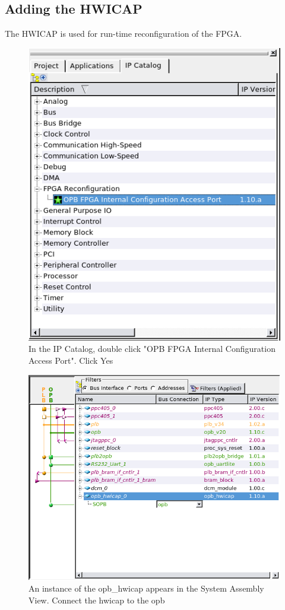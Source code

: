 \documentclass[a4paper,oneside]{memoir}
\begin{document}
\subsection{Adding the HWICAP}
The HWICAP is used for run-time reconfiguration of the FPGA.
\begin{figure}[H]
\centering
\includegraphics[scale=0.5]{HWICAP1}
\caption{In the IP Catalog, double click "OPB FPGA Internal Configuration Access Port". Click Yes\label{fig:HWICAP1}}
\end{figure}
\begin{figure}[H]
\centering
\includegraphics[scale=0.5]{HWICAP2}
\caption{An instance of the opb\_hwicap appears in the System Assembly View. Connect the hwicap to the opb\label{fig:HWICAP2}}
\end{figure}
\end{document}
